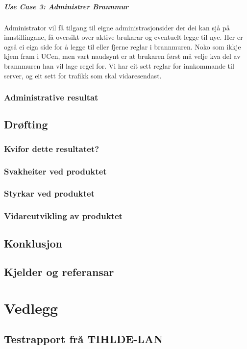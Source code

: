 \documentclass[nynorsk,12pt,a4paper,oneside]{book}
\begin{document}
\subsubsection{Use Case 3: Administrer Brannmur}
Administrator vil få tilgang til eigne administrasjonsider der dei kan sjå på innstillingane, få oversikt over aktive brukarar og eventuelt legge til nye. Her er også ei eiga side for å legge til eller fjerne reglar i brannmuren. Noko som ikkje kjem fram i UCen, men vart naudsynt er at brukaren først må velje kva del av brannmuren han vil lage regel for. Vi har eit sett reglar for innkommande til server, og eit sett for trafikk som skal vidaresendast.

\section{Administrative resultat}


\chapter{Drøfting}
\section{Kvifor dette resultatet?}
\section{Svakheiter ved produktet}
\section{Styrkar ved produktet}
\section{Vidareutvikling av produktet}
\chapter{Konklusjon}
\chapter{Kjelder og referansar}




\part{Vedlegg}
\appendix 
\chapter{Testrapport frå TIHLDE-LAN}
\end{document}
